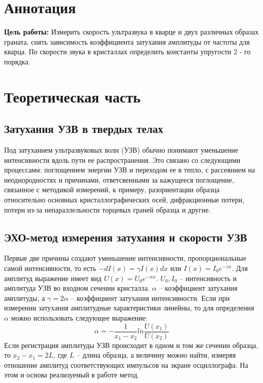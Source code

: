 \documentclass[a4paper, 12pt]{article}
\begin{document}
\newpage
\tableofcontents

\newpage
\section{Аннотация}
\textbf{Цель работы:} Измерить скорость ультразвука в кварце и двух различных образах граната, снять зависимость коэффициента затухания амплитуды от частоты для кварца. По скорости звука в кристаллах определить константы упругости 2 - го порядка.

    
   

\section{Теоретическая часть}
\subsection{Затухания УЗВ в твердых телах}
Под затуханием ультразвуковых волн (УЗВ) обычно понимают уменьшение интенсивности вдоль пути ее распространения. Это связано со следующими процессами: поглощением энергии УЗВ и переходом ее в тепло, с рассеянием на неоднородностях и причинами, ответсвенными за кажущееся поглощение, связанное с методикой измерений, к примеру, разориентации образца относительно основных кристаллографических осей, дифракционные потери, потери из-за непараллельности торцевых граней образца и другие.
\subsection{ЭХО-метод измерения затухания и скорости УЗВ}
Первые две причины создают уменьшение интенсивности, пропорциональные самой интенсивности, то есть $-dI(x)=\gamma I(x)dx$ или $I(x)=I_{0}e^{-\gamma x}$. Для амплитуд выражение имеет вид $U(x)=U_{0}e^{-\alpha x}$. $U_{0}, I_{0}$ – интенсивность и амплитуда УЗВ во входном сечении кристалла. $\alpha$ – коэффициент затухания амплитуды, а $\gamma=2\alpha$ – коэффициент затухания интенсивности. Если при измерении затухания амплитудные характеристики линейны, то для определения $\alpha$ можно использовать следующее выражение:
\begin{equation}
\label{а}
\alpha=-\frac{1}{x_{1}-x_{2}}ln\frac{U(x_{1})}{U(x_{2})}
\end{equation}
Если регистрация амплитуды УЗВ происходит в одном и том же сечении образца, то $x_{2}-x_{1}=2L$, где $L$ – длина образца, а величину можно найти, измеряя отношение амплитуд соответствующих импульсов на экране осциллографа. На этом и основа реализуемый в работе метод.
\end{document}
